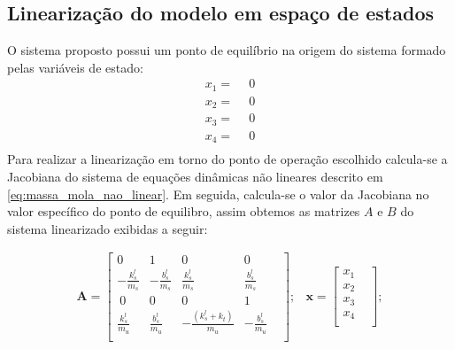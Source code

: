 \subsection{Linearização do modelo em espaço de estados}

O sistema proposto possui um ponto de equilíbrio na origem do sistema formado pelas variáveis de estado:
\begin{equation*}
    \begin{split}
        x_1=\ \ &0\\
        x_2=\ \ &0\\
        x_3=\ \ &0\\
        x_4=\ \ &0\\
    \end{split}
\end{equation*}
Para realizar a linearização em torno do ponto de operação escolhido calcula-se a Jacobiana do sistema de equações dinâmicas não lineares descrito em \eqref{eq:massa_mola_nao_linear}. Em seguida, calcula-se o valor da Jacobiana no valor específico do ponto de equilibro, assim obtemos as matrizes $A$ e $B$ do sistema linearizado exibidas a seguir:
 
\begin{equation}\label{ed:linsys:ax}
    \begin{split}
        \mathbf{A} =
        \begin{bmatrix}
            0 & 1 & 0 & 0 & \\            
            -\frac{k_{s}^{l}}{m_s}&-\frac{b_{s}^{l}}{m_s}&\frac{k_{s}^{l}}{m_s}&\frac{b_{s}^{l}}{m_s} &\\ \  
            0 & 0 & 0 & 1 & \\
            \frac{k_{s}^{l}}{m_u}&\frac{b_{s}^{l}}{m_u}&-\frac{(k_{s}^{l}+k_t)}{m_u}&-\frac{b_{s}^{l}}{m_u} &\\
        \end{bmatrix};
    \end{split}
    \begin{split}
       \mathbf{x} = 
        \begin{bmatrix}
             x_1 &\\
             x_2 &\\
             x_3 &\\
             x_4 &\\
        \end{bmatrix}; 
    \end{split}
\end{equation}
    

